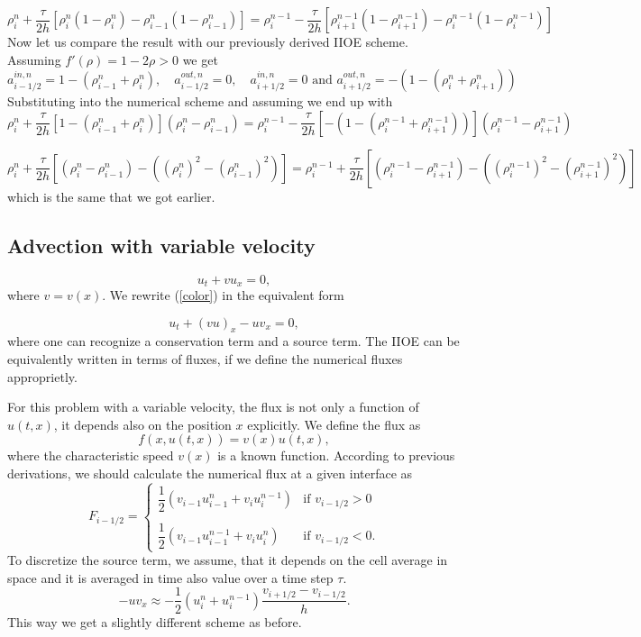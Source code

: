 \documentclass{article}
\begin{document}
\[
\rho_i^{n} + \frac{\tau}{2h}\left[\rho^n_{i} (1 - \rho^n_{i}) - \rho^n_{i-1} (1 - \rho^n_{i-1})\right]
=
\rho_i^{n - 1} - \dfrac{\tau}{2h}\left[\rho^{n-1}_{i+1} (1 - \rho^{n-1}_{i+1}) - \rho^{n-1}_{i} (1 - \rho^{n-1}_{i})\right]
\]
Now let us compare the result with our previously derived IIOE scheme.\\
Assuming $ f'(\rho) = 1 - 2\rho > 0 $ we get \\
\[
a^{in,n}_{i-1/2} = 1 - (\rho^n_{i-1} + \rho^n_{i}),\quad a^{out,n}_{i-1/2} = 0,\quad a^{in,n}_{i + 1/2} = 0 \text{ and } a^{out,n}_{i+1/2} = -\left(1 - (\rho^n_{i} + \rho^n_{i+1}) \right)
\]
Substituting into the numerical scheme and assuming we end up with
\[
	\rho^n_i + \frac{\tau}{2h} \left[1 - (\rho^n_{i-1} + \rho^n_{i})\right] \left(\rho^n_i - \rho^n_{i-1}\right)
	= 
	\rho^{n-1}_i - \frac{\tau}{2h} 
	\left[-\left(1 - (\rho^{n-1}_{i} + \rho^{n-1}_{i+1}) \right)\right] \left(\rho^{n-1}_i - \rho^{n-1}_{i+1}\right)
\]

\[
\rho^n_i + \frac{\tau}{2h} \left[\left(\rho^n_i - \rho^n_{i-1}\right) - ((\rho^n_{i})^2 - (\rho^n_{i-1})^2)\right] 
= 
\rho^{n-1}_i + \frac{\tau}{2h} \left[\left(\rho^{n-1}_i - \rho^{n-1}_{i+1}\right) - ((\rho^{n-1}_{i})^2 - (\rho^{n-1}_{i+1})^2)\right] 
\]
which is the same that we got earlier.
\subsection{Advection with variable velocity}
\begin{equation}
	u_t + vu_x = 0, 
	\label{color}
\end{equation}
where $ v = v(x) $. We rewrite (\ref{color}) in the equivalent form

\begin{equation}
	u_t + (vu)_x - uv_x = 0,
\end{equation}
where one can recognize a conservation term and a source term. The IIOE can be equivalently written in terms of fluxes, if we define the numerical fluxes approprietly.

For this problem with a variable velocity, the flux is not only a function of $ u(t,x) $, it depends also on the position $ x $ explicitly. We define the flux as
\[
f(x, u(t, x)) = v(x) u(t, x),
\]
where the characteristic speed $ v(x) $ is a known function. According to previous derivations, we should calculate the numerical flux at a given interface as
\[
F_{i - 1/2} = 
\begin{cases}
	\dfrac{1}{2}(v_{i-1}u^n_{i-1} + v_{i}u^{n-1}_{i}) &  \text{if } v_{i-1/2} > 0\\
	\\
	\dfrac{1}{2}(v_{i-1}u^{n-1}_{i-1} + v_{i}u^{n}_{i}) &  \text{if } v_{i-1/2} < 0.
\end{cases}
\]
To discretize the source term, we assume, that it depends on the cell average in space and it is averaged in time also value over a time step $ \tau $.
\begin{equation}
	-uv_x \approx -\frac{1}{2}(u_i^n + u_i^{n-1})\frac{v_{i+1/2} - v_{i-1/2}}{h}.
\end{equation}
This way we get a slightly different scheme as before.
\end{document}
